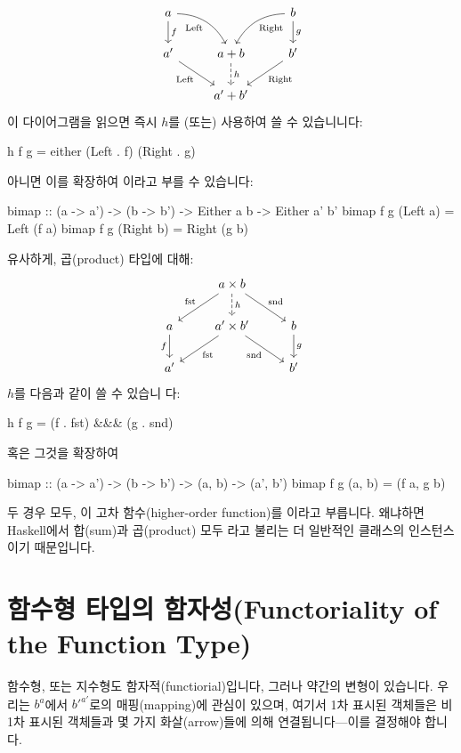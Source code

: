 \documentclass[DaoFP]{subfiles}
\begin{document}
\[
 \begin{tikzcd}
 a
 \arrow[d, "f"]
 \arrow[dr,  bend left, "\text{Left}"']
  && b
 \arrow[d, "g"]
 \arrow[dl, bend right, "\text{Right}"]
 \\
 a'
 \arrow[rd, "\text{Left}"']
&a + b
\arrow[d, dashed, "h"]
& b'
\arrow[ld, "\text{Right}"]
\\
& a' + b'
 \end{tikzcd}
\]
이 다이어그램을 읽으면 즉시 $h$를 (또는) 사용하여 쓸 수 있습니니다:
\begin{haskell}
h f g = either (Left . f) (Right . g)
\end{haskell}
아니면 이를 확장하여 이라고 부를 수 있습니다:
\begin{haskell}
bimap :: (a -> a') -> (b -> b') -> Either a b -> Either a' b'
bimap f g (Left  a) = Left  (f a)
bimap f g (Right b) = Right (g b)
\end{haskell}
유사하게, 곱(product) 타입에 대해:
\[
 \begin{tikzcd}
 & a \times b
\arrow[d, dashed, "h"]
 \arrow[dl,  "\text{fst}"']
 \arrow[dr,   "\text{snd}"]
\\
a
\arrow[d, "f"']
&a' \times b'
 \arrow[dl,  "\text{fst}"]
  \arrow[dr,   "\text{snd}"']
& b
\arrow[d, "g"]
\\
a' && b'
 \end{tikzcd}
\]
$h$를 다음과 같이 쓸 수 있습니 다:
\begin{haskell}
h f g = (f . fst) &&& (g . snd)
\end{haskell}
혹은 그것을 확장하여
\begin{haskell}
bimap :: (a -> a') -> (b -> b') -> (a, b) -> (a', b')
bimap f g (a, b) = (f a, g b)
\end{haskell}
두 경우 모두, 이 고차 함수(higher-order function)를 이라고 부릅니다. 왜냐하면 Haskell에서 합(sum)과 곱(product) 모두 라고 불리는 더 일반적인 클래스의 인스턴스이기 때문입니다.

\section{함수형 타입의 함자성(Functoriality of the Function Type)}

함수형, 또는 지수형도 함자적(functiorial)입니다, 그러나 약간의 변형이 있습니다. 우리는 $b^a$에서 $b'^{a'}$로의 매핑(mapping)에 관심이 있으며, 여기서 1차 표시된 객체들은 비 1차 표시된 객체들과 몇 가지 화살(arrow)들에 의해 연결됩니다---이를 결정해야 합니다.
\end{document}
